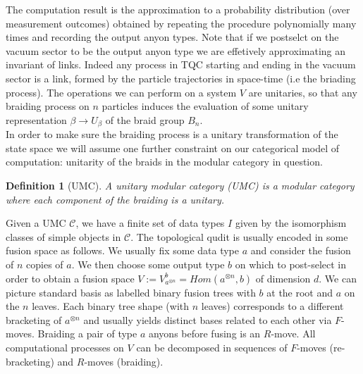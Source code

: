\documentclass{article}
\newtheorem{definition}{Definition}
\newcommand{\cat}{\mathcal{C}}
\begin{document}
The computation result is the approximation to a probability distribution (over measurement outcomes) obtained by repeating the procedure polynomially many times and recording the output anyon types. Note that if we postselct on the vacuum sector to be the output anyon type we are effetively approximating an invariant of links. Indeed any process in TQC starting and ending in the vacuum sector is a link, formed by the particle trajectories in space-time (i.e the briading process). The operations we can perform on a system $V$ are unitaries, so that any braiding process on $n$ particles induces the evaluation of some unitary representation $\beta \rightarrow U_\beta$ of the braid group $B_n$.\\
In order to make sure the braiding process is a unitary transformation of the state space we will assume one further constraint on our categorical model of computation: unitarity of the braids in the modular category in question.\\
\begin{definition}[UMC]
	A unitary modular category (UMC) is a modular category where each component of the braiding is a unitary.
\end{definition}
Given a UMC $\cat$, we have a finite set of data types $I$ given by the isomorphism classes of simple objects in $\cat$. The topological qudit is usually encoded in some fusion space as follows. We usually fix some data type $a$ and consider the fusion of $n$ copies of $a$. We then choose some output type $b$ on which to post-select in order to obtain a fusion space $V := V_{a^{\otimes n}}^b = Hom(a^{\otimes n}, b)$ of dimension $d$. We can picture standard basis as labelled binary fusion trees with $b$ at the root and $a$ on the $n$ leaves. Each binary tree shape (with $n$ leaves) corresponds to a different bracketing of $a^{\otimes n}$ and usually yields distinct bases related to each other via $F$-moves. Braiding a pair of type $a$ anyons before fusing is an $R$-move. All computational processes on $V$ can be decomposed in sequences of $F$-moves (re-bracketing) and $R$-moves (braiding).
\end{document}
